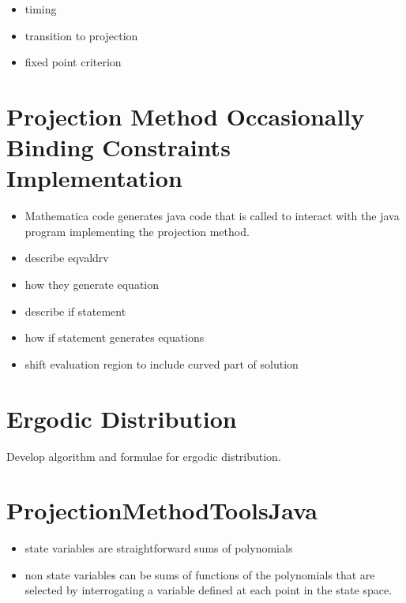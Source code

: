 \documentclass[12pt]{article}
\begin{document}
\begin{itemize}
\item timing
\item transition to projection
\item fixed point criterion
\end{itemize}





\section{Projection Method Occasionally Binding Constraints Implementation}
\label{sec:proj-meth-occass}
\begin{itemize}
\item Mathematica code generates java code that is called to interact with the java program implementing the projection method.
\item describe eqvaldrv
\item how they generate equation
\item describe if statement
\item how if statement generates equations
\item shift evaluation region to include curved part of solution
\end{itemize}


\section{Ergodic Distribution}
\label{sec:ergodic-distribution}

Develop algorithm and formulae for ergodic distribution.

\appendix
\section{ProjectionMethodToolsJava}
\label{sec:proj}

\begin{itemize}
\item state variables are straightforward sums of polynomials
\item non state variables can be sums of functions of the polynomials that are selected by interrogating a variable defined at each point in the state space.
\end{itemize}


\end{document}
